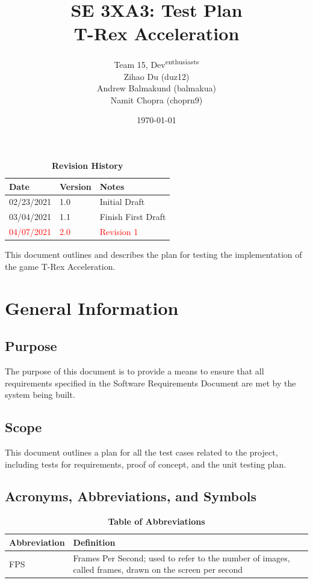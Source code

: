 \documentclass[12pt, titlepage]{article}
\title{SE 3XA3: Test Plan\\T-Rex Acceleration}
\author{Team 15, Dev\textsuperscript{enthusiasts}
		\\ Zihao Du (duz12)
		\\  Andrew Balmakund (balmakua) 
		\\ Namit Chopra (choprn9)
}
\date{\today}
\begin{document}
\maketitle

\tableofcontents
\listoftables
\listoffigures

\begin{table}[bp]
\caption{\bf Revision History}
\begin{tabularx}{\textwidth}{p{3cm}p{2cm}X}
\toprule {\bf Date} & {\bf Version} & {\bf Notes}\\
\midrule
02/23/2021 & 1.0 & Initial Draft\\
03/04/2021 & 1.1 & Finish First Draft\\
\textcolor{red}{04/07/2021} & \textcolor{red}{2.0} & \textcolor{red}{Revision 1}\\
\bottomrule
\end{tabularx}
\end{table}

\newpage


This document outlines and describes the plan for testing the implementation of the game T-Rex Acceleration. 

\section{General Information}

\subsection{Purpose}
The purpose of this document is to provide a means to ensure that all requirements specified in the Software Requirements Document are met by the system being built.
\subsection{Scope}
This document outlines a plan for all the test cases related to the project, including tests for requirements, proof of concept, and the unit testing plan.
\subsection{Acronyms, Abbreviations, and Symbols}
	
\begin{table}[hbp]
\caption{\textbf{Table of Abbreviations}} \label{Table}

\begin{tabularx}{\textwidth}{p{3cm}X}
\toprule
\textbf{Abbreviation} & \textbf{Definition} \\
\midrule
FPS & Frames Per Second; used to refer to the number of images, called frames, drawn on the screen per second\\
\bottomrule
\end{tabularx}

\end{table}
\end{document}

